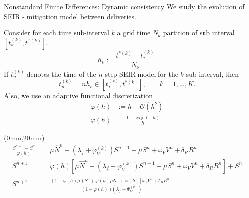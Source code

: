 \begin{frame}{Nonstandard Finite Differences: Dynamic consistency}
    We study the evolution of SEIR - mitigation model between
    deliveries.

    Consider for each time sub-interval $k$  a grid time $N_k$ partition of
    sub interval $[t_{*}^{(k)},t^{*(k)}].$
    $$
        h_k:= \frac{t^{*(k)} - t_{*}^{(k)}}{N_k}.
    $$
    If $t_n^{(k)}$ denotes the time of the $n$ step SEIR model for the
    $k$ sub interval, then
    $$
        t_n^{(k)} =
            n h_k \in [t_{*}^{(k)},t^{*(k)}],
            \qquad k = 1,\dots,
            K.
    $$
    Also, we use an adaptive functional discretization
    \begin{align*}
        \varphi(h) &:= h +  \mathcal{O}(h^2)
        \\
        \varphi(h) &= \frac{1-\exp(-h)}{h}
    \end{align*}
\end{frame}
\begin{frame}{}
    \begin{textblock*}{120mm}(0mm,20mm)
            \begin{align*}
                \frac{S^{n+1} - S^n}{\varphi(h)}
                    &= \mu \widehat{N}^n
                    - (\lambda_f + \varphi_V^{(k)}) S^{n+1}
                    - \mu S^n + \omega_V V^n + \delta_R R^n
                    \\
                S^{n+1} &=
                    \varphi(h)[
                        \mu \widehat{N}^n
                        - (\lambda_f +  \varphi_V^{(k)}) S^{n+1}
                        - \mu S^n + \omega_V V^n + \delta_R R^n
                    ] + S^n
                    \\
                S^{n+1} &=
                    \frac{
                        (1-\varphi(h) \mu) S^n
                        + \varphi(h)\mu \widehat{N}^n
                        + \varphi(h)[
                            \omega_V V^n
                            + \delta_R R^n
                        ]}{
                                (1 + \varphi(h))
                                (\lambda_f + \Psi_V^{(k)})
                    }
            \end{align*}
    \end{textblock*}
\end{frame}
%
